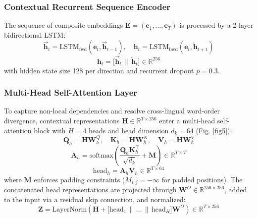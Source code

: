 \documentclass[default,iicol]{sn-jnl}
\begin{document}
\subsubsection{Contextual Recurrent Sequence Encoder}
The sequence of composite embeddings $\mathbf{E} = (\mathbf{e}_1, \dots, \mathbf{e}_T)$ is processed by a 2-layer bidirectional LSTM:
\begin{equation}
\overrightarrow{\mathbf{h}}_t = \text{LSTM}_{\text{fwd}}(\mathbf{e}_t, \overrightarrow{\mathbf{h}}_{t-1}), \quad \overleftarrow{\mathbf{h}}_t = \text{LSTM}_{\text{bwd}}(\mathbf{e}_t, \overleftarrow{\mathbf{h}}_{t+1})
\end{equation}
\begin{equation}
\mathbf{h}_t = \big[ \overrightarrow{\mathbf{h}}_t \,\|\, \overleftarrow{\mathbf{h}}_t \big] \in \mathbb{R}^{256}
\end{equation}
with hidden state size 128 per direction and recurrent dropout $p = 0.3$.

\subsubsection{Multi-Head Self-Attention Layer}
To capture non-local dependencies and resolve cross-lingual word-order divergence, contextual representations $\mathbf{H} \in \mathbb{R}^{T \times 256}$ enter a multi-head self-attention block with $H = 4$ heads and head dimension $d_k = 64$ (Fig. \ref{fig5}):
\begin{equation}
\mathbf{Q}_h = \mathbf{H} \mathbf{W}_h^Q, \quad \mathbf{K}_h = \mathbf{H} \mathbf{W}_h^K, \quad \mathbf{V}_h = \mathbf{H} \mathbf{W}_h^V
\end{equation}
\begin{equation}
\mathbf{A}_h = \text{softmax}\left( \frac{\mathbf{Q}_h \mathbf{K}_h^\top}{\sqrt{d_k}} + \mathbf{M} \right) \in \mathbb{R}^{T \times T}
\end{equation}
\begin{equation}
\text{head}_h = \mathbf{A}_h \mathbf{V}_h \in \mathbb{R}^{T \times 64}
\end{equation}
where $\mathbf{M}$ enforces padding constraints ($M_{i,j} = -\infty$ for padded positions). The concatenated head representations are projected through $\mathbf{W}^O \in \mathbb{R}^{256 \times 256}$, added to the input via a residual skip connection, and normalized:
\begin{equation}
\mathbf{Z} = \text{LayerNorm}\left( \mathbf{H} + \big[ \text{head}_1 \,\|\, \dots \,\|\, \text{head}_H \big] \mathbf{W}^O \right) \in \mathbb{R}^{T \times 256}
\end{equation}
\end{document}
